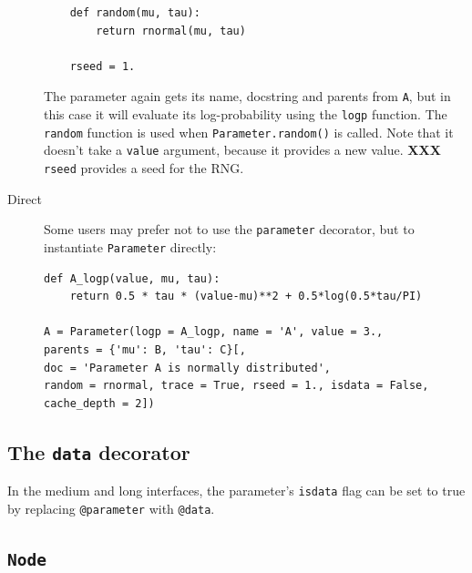 \documentclass[]{book}
\begin{document}
\begin{description}
\begin{verbatim}
    def random(mu, tau):
        return rnormal(mu, tau)

    rseed = 1.
    \end{verbatim}
The parameter again gets its name, docstring and parents from \texttt{A}, but in this case it will evaluate its log-probability using the \texttt{logp} function. The \texttt{random} function is used when \texttt{Parameter.random()} is called. Note that it doesn't take a \texttt{value} argument, because it provides a new value. \textbf{XXX} \texttt{rseed} provides a seed for the RNG.

    \item[Direct] Some users may prefer not to use the \texttt{parameter} decorator, but to instantiate \texttt{Parameter} directly:
\begin{verbatim}
def A_logp(value, mu, tau):
    return 0.5 * tau * (value-mu)**2 + 0.5*log(0.5*tau/PI)

A = Parameter(logp = A_logp, name = 'A', value = 3.,
parents = {'mu': B, 'tau': C}[,
doc = 'Parameter A is normally distributed',
random = rnormal, trace = True, rseed = 1., isdata = False,
cache_depth = 2])
\end{verbatim}
\end{description}



\subsection{The \texttt{data} decorator}\label{sub:@data}
In the medium and long interfaces, the parameter's \texttt{isdata} flag can be set to true by replacing \texttt{@parameter} with \texttt{@data}.


\subsection{\texttt{Node}}\label{sub:node}
\end{document}

